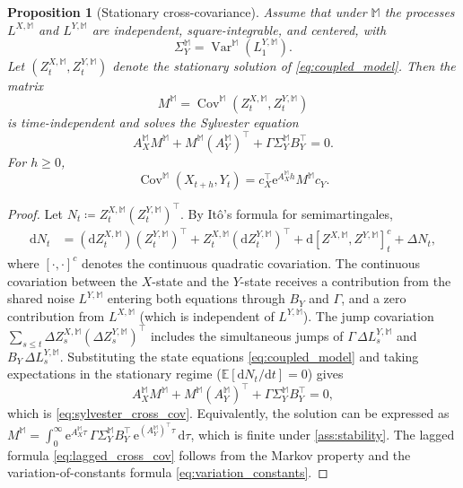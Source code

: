 \documentclass[10pt,a4paper,reqno]{amsart}
\newtheorem{proposition}[theorem]{Proposition}
\newcommand{\1}{\mathbbm{1}}
\newcommand{\dd}{\mathrm{d}}
\newcommand{\ee}{\mathrm{e}}
\DeclareMathOperator{\Cov}{Cov}
\DeclareMathOperator{\Var}{Var}
\begin{document}
\begin{proposition}[Stationary cross-covariance]
\label{prop:cross_covariance}
Assume that under \(\mathbb{M}\) the processes \(L^{X,\mathbb{M}}\) and
\(L^{Y,\mathbb{M}}\) are independent, square-integrable, and centered, with
\[
\Sigma_Y^{\mathbb{M}} = \Var^{\mathbb{M}}(L_1^{Y,\mathbb{M}}).
\]
Let \((Z_t^{X,\mathbb{M}},Z_t^{Y,\mathbb{M}})\) denote the stationary solution
of \eqref{eq:coupled_model}. Then the matrix
\[
M^{\mathbb{M}} = \Cov^{\mathbb{M}}(Z_t^{X,\mathbb{M}}, Z_t^{Y,\mathbb{M}})
\]
is time-independent and solves the Sylvester equation
\begin{equation}\label{eq:sylvester_cross_cov}
  A_X^{\mathbb{M}} M^{\mathbb{M}}
  + M^{\mathbb{M}} (A_Y^{\mathbb{M}})^\top
  + \Gamma \Sigma_Y^{\mathbb{M}} B_Y^\top
  = 0.
\end{equation}
For \(h \ge 0\),
\begin{equation}\label{eq:lagged_cross_cov}
  \Cov^{\mathbb{M}}(X_{t+h},Y_t)
  = c_X^\top
      \ee^{A_X^{\mathbb{M}} h}
      M^{\mathbb{M}}
      c_Y.
\end{equation}
\end{proposition}

\begin{proof}
Let \(N_t \coloneqq Z_t^{X,\mathbb{M}}(Z_t^{Y,\mathbb{M}})^\top\). By Itô's
formula for semimartingales,
\begin{align*}
  \dd N_t
  &= (\dd Z_t^{X,\mathbb{M}})(Z_t^{Y,\mathbb{M}})^\top
     + Z_t^{X,\mathbb{M}}(\dd Z_t^{Y,\mathbb{M}})^\top
     + \dd [Z^{X,\mathbb{M}}, Z^{Y,\mathbb{M}}]_t^c + \Delta N_t,
\end{align*}
where \([{\cdot},{\cdot}]^c\) denotes the continuous quadratic covariation.
The continuous covariation between the \(X\)-state and the \(Y\)-state receives
a contribution from the shared noise \(L^{Y,\mathbb{M}}\) entering both
equations through \(B_Y\) and \(\Gamma\), and a zero contribution from
\(L^{X,\mathbb{M}}\) (which is independent of \(L^{Y,\mathbb{M}}\)). The jump
covariation \(\sum_{s \le t}\Delta Z_s^{X,\mathbb{M}}
(\Delta Z_s^{Y,\mathbb{M}})^\top\) includes the simultaneous jumps of
\(\Gamma\,\Delta L_s^{Y,\mathbb{M}}\) and \(B_Y\,\Delta L_s^{Y,\mathbb{M}}\).
Substituting the state equations \eqref{eq:coupled_model} and taking
expectations in the stationary regime
(\(\mathbb{E}[\dd N_t/\dd t] = 0\)) gives
\[
  A_X^{\mathbb{M}} M^{\mathbb{M}}
  + M^{\mathbb{M}} (A_Y^{\mathbb{M}})^\top
  + \Gamma \Sigma_Y^{\mathbb{M}} B_Y^\top
  = 0,
\]
which is \eqref{eq:sylvester_cross_cov}. Equivalently, the solution can be
expressed as
\(M^{\mathbb{M}} = \int_0^\infty \ee^{A_X^{\mathbb{M}} \tau}\,
\Gamma \Sigma_Y^{\mathbb{M}} B_Y^\top\,
\ee^{(A_Y^{\mathbb{M}})^\top \tau}\,\dd\tau\),
which is finite under \ref{ass:stability}. The lagged
formula \eqref{eq:lagged_cross_cov} follows from the Markov property and the
variation-of-constants formula \eqref{eq:variation_constants}.
\end{proof}
\end{document}

